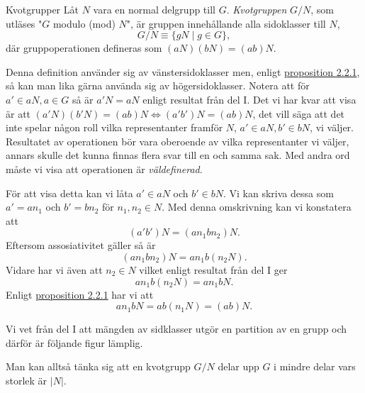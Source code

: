 \documentclass{article}
\theoremstyle{definition}
\begin{document}
\begin{mydef}{Kvotgrupper}{}
  Låt $N$ vara en normal delgrupp till $G$. \textit{Kvotgruppen} $G/N$, som utläses "$G$ modulo (mod) $N$", är gruppen innehållande alla 
  sidoklasser till $N$, 
  \[G/N \equiv \{gN \; | \; g \in G\},\]
  där gruppoperationen defineras som $(aN) (bN) = (ab)N$. 
\end{mydef}
Denna definition använder sig av vänstersidoklasser men, enligt \hyperlink{prop1}{proposition 2.2.1}, så kan man lika gärna använda sig 
av högersidoklasser. Notera att för $a' \in aN, a \in G$ så är $a'N = aN$ enligt resultat från del I. Det vi har kvar att visa är att $(a'N) (b'N) = (ab)N
\iff (a'b')N = (ab)N$, det vill säga att det inte spelar någon roll vilka representanter framför $N$, $a' \in aN, b' \in bN$, vi väljer. Resultatet av 
operationen bör vara oberoende av vilka representanter vi väljer, annars skulle det kunna finnas flera svar till en och samma sak. Med 
andra ord måste vi visa att operationen är \textit{väldefinerad}.

För att visa detta kan vi låta $a' \in aN$ och $b' \in bN$. Vi kan skriva dessa som $a' = an_1$ och $b' = bn_2$ för $n_1, n_2 \in N$. Med denna 
omskrivning kan vi konstatera att
\[(a'b')N = (an_1bn_2)N.\]
Eftersom assosiativitet gäller så är 
\[(an_1bn_2)N = an_1b(n_2N).\]
Vidare har vi även att $n_2 \in N$ vilket enligt resultat från del I ger 
\[an_1b(n_2N) = an_1bN.\]
Enligt \hyperlink{prop1}{proposition 2.2.1} har vi att 
\[an_1bN = ab(n_1N) = (ab)N.\]

Vi vet från del I att mängden av sidklasser utgör en partition av en grupp och därför är följande figur lämplig.

\begin{center}
\end{center}
Man kan alltså tänka sig att en kvotgrupp $G/N$ delar upp $G$ i mindre delar vars storlek är $|N|$. 
\end{document}
